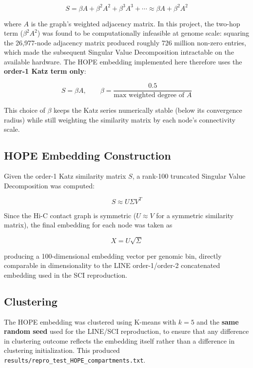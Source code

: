 \documentclass[12pt]{article}
\begin{document}
\begin{equation}
    S = \beta A + \beta^2 A^2 + \beta^3 A^3 + \cdots \approx \beta A + \beta^2 A^2
\end{equation}

where $A$ is the graph's weighted adjacency matrix. In this project, the two-hop term
($\beta^2 A^2$) was found to be computationally infeasible at genome scale: squaring the
26,977-node adjacency matrix produced roughly 726 million non-zero entries, which made the
subsequent Singular Value Decomposition intractable on the available hardware. The HOPE
embedding implemented here therefore uses the \textbf{order-1 Katz term only}:

\begin{equation}
    S = \beta A, \qquad \beta = \frac{0.5}{\text{max weighted degree of } A}
\end{equation}

This choice of $\beta$ keeps the Katz series numerically stable (below its convergence radius)
while still weighting the similarity matrix by each node's connectivity scale.

\subsection{HOPE Embedding Construction}
Given the order-1 Katz similarity matrix $S$, a rank-100 truncated Singular Value Decomposition
was computed:

\begin{equation}
    S \approx U \Sigma V^{T}
\end{equation}

Since the Hi-C contact graph is symmetric ($U \approx V$ for a symmetric similarity matrix), the
final embedding for each node was taken as

\begin{equation}
    X = U \sqrt{\Sigma}
\end{equation}

producing a 100-dimensional embedding vector per genomic bin, directly comparable in dimensionality
to the LINE order-1/order-2 concatenated embedding used in the SCI reproduction.

\subsection{Clustering}
The HOPE embedding was clustered using K-means with $k=5$ and the \textbf{same random seed}
used for the LINE/SCI reproduction, to ensure that any difference in clustering outcome reflects
the embedding itself rather than a difference in clustering initialization. This produced
\texttt{results/repro\_test\_HOPE\_compartments.txt}.
\end{document}

